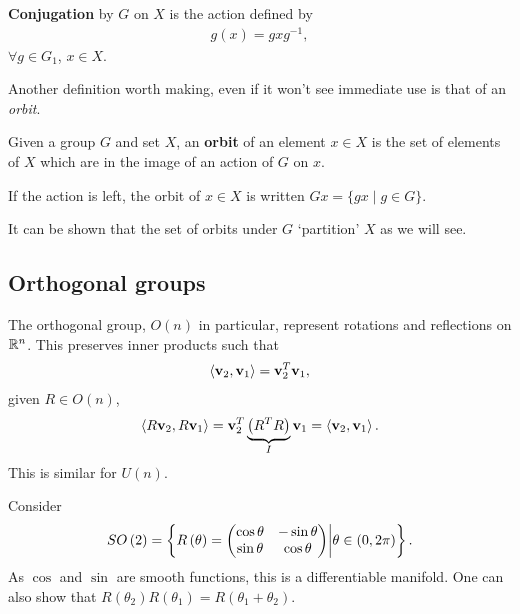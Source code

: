 \begin{definition}
    \textbf{Conjugation} by $G$ on $X$ is the action defined by
    \begin{align}
        g \left( x \right) = g x g^{-1}
    ,\end{align}
    $\forall g \in G_1$, $x \in X$.
\end{definition}

Another definition worth making, even if it won't see immediate use is that of an \textit{orbit}.

\begin{definition}
    Given a group $G$ and set $X$, an \textbf{orbit} of an element $x \in X$ is the set of elements of $X$ which are in the image of an action of $G$ on $x$.
\end{definition}

\begin{example}
    If the action is left, the orbit of $x \in X$ is written $Gx = \{g x  \mid  g \in G\} $.
\end{example}

It can be shown that the set of orbits under $G$ `partition' $X$ as we will see.

\subsection{Orthogonal groups}

The orthogonal group, $O\left( n \right) $ in particular, represent rotations and reflections on $\mathbb{R}^{n}$. This preserves inner products such that
\begin{align}
    \left<\vb{v}_2, \vb{v}_1 \right> = \vb{v}_2^{T} \vb{v}_1
,\end{align}
given $R \in O \left( n \right) $,
\begin{align}
    \left< R \vb{v}_2, R\vb{v}_1 \right> = \vb{v}_2^{T} \underbrace{\left( R^{T} R \right) }_{I} \vb{v}_1 = \left<\vb{v}_2 , \vb{v}_1 \right>
.\end{align}
This is similar for $U\left( n \right) $.

Consider
\begin{align}
    SO\left( 2 \right) = \left\{ R\left( \theta \right) = \mqty( \cos \theta & -\sin \theta \\ \sin \theta & \cos \theta) \bigg| \theta \in \left( 0, 2\pi \right)  \right\}  
.\end{align}
As $\cos$ and $\sin$ are smooth functions, this is a differentiable manifold. One can also show that $R \left( \theta_2 \right) R \left( \theta_1 \right) = R \left( \theta_1 + \theta_2 \right) $.

